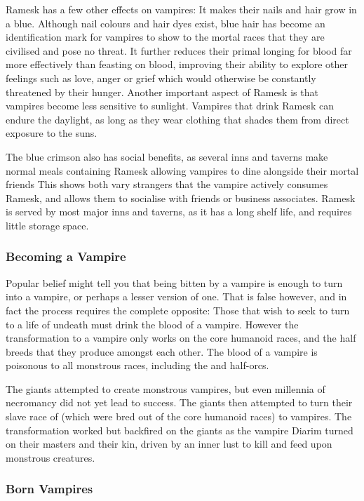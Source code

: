 Ramesk has a few other effects on vampires: It makes their nails and hair grow
in a blue. Although nail colours and hair dyes exist, blue hair has become an
identification mark for vampires to show to the mortal races that they are
civilised and pose no threat. It further reduces their primal longing for
blood far more effectively than feasting on blood, improving their ability to
explore other feelings such as love, anger or grief which would otherwise be
constantly threatened by their hunger. Another important aspect of Ramesk is
that vampires become less sensitive to sunlight. Vampires that drink Ramesk
can endure the daylight, as long as they wear clothing that shades them from
direct exposure to the suns.

The blue crimson also has social benefits, as several inns and taverns make
normal meals containing Ramesk allowing vampires to dine alongside their
mortal friends  This shows both vary strangers that the vampire actively
consumes Ramesk, and allows them to socialise with friends or business
associates. Ramesk is served by most major inns and taverns, as it has a long
shelf life, and requires little storage space.

\subsubsection{Becoming a Vampire}

Popular belief might tell you that being bitten by a vampire is enough to turn
into a vampire, or perhaps a lesser version of one. That is false however, and
in fact the process requires the complete opposite: Those that wish to seek to
turn to a life of undeath must drink the blood of a vampire. However the
transformation to a vampire only works on the core humanoid races, and the half
breeds that they produce amongst each other. The blood of a vampire is poisonous
to all monstrous races, including the  and half-orcs.

The giants attempted to create monstrous vampires, but even millennia of
necromancy did not yet lead to success. The giants then attempted to turn
their slave race of  (which were bred out of the core
humanoid races) to vampires. The transformation worked but backfired on the
giants as the vampire Diarim turned on their masters and their kin, driven by
an inner lust to kill and feed upon monstrous creatures.

\subsubsection{Born Vampires}
\label{sec:Born Vampires}

